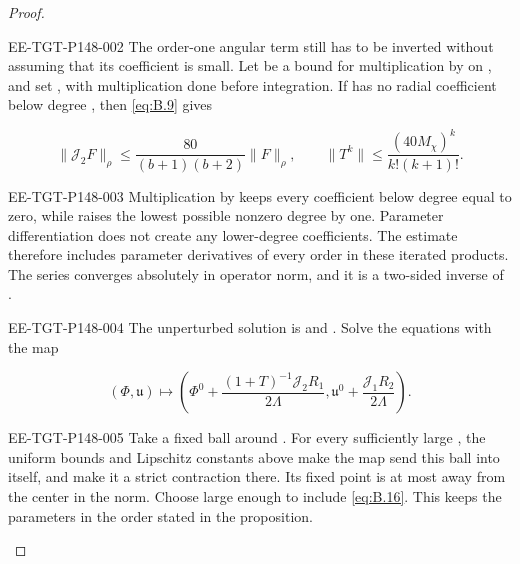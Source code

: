 \begin{proof}
\begin{EESegment}{EE-TGT-P148-002}
The order-one angular term still has to be inverted without assuming that its coefficient is small.
Let  be a bound for multiplication by
 on , and set
, with multiplication done before integration. If
 has no radial coefficient below degree , then
\eqref{eq:B.9} gives
\end{EESegment}
\begin{equation*}
  \lVert\mathcal J_2F\rVert_\rho
  \leq\frac{80}{(b+1)(b+2)}\lVert F\rVert_\rho,
  \qquad
  \lVert T^k\rVert\leq\frac{(40M_\chi)^k}{k!(k+1)!}.
\end{equation*}
\begin{EESegment}{EE-TGT-P148-003}
Multiplication by  keeps every coefficient below degree
 equal to zero, while  raises the lowest
possible nonzero degree by one. Parameter differentiation does not create any lower-degree
coefficients. The estimate therefore includes parameter derivatives of every order in these
iterated products. The series  converges absolutely in
operator norm, and it is a two-sided inverse of .
\end{EESegment}

\begin{EESegment}{EE-TGT-P148-004}
The unperturbed solution is
 and
. Solve the equations with the map
\end{EESegment}
\begin{equation*}
  (\Phi,\mathfrak u)\longmapsto
  \left(\Phi^0+\frac{(1+T)^{-1}\mathcal J_2R_1}{2\Lambda},
        \mathfrak u^0+\frac{\mathcal J_1R_2}{2\Lambda}\right).
\end{equation*}
\begin{EESegment}{EE-TGT-P148-005}
Take a fixed ball around . For every sufficiently
large , the uniform bounds and Lipschitz constants above make the map
send this ball into itself, and make it a strict contraction there. Its fixed point is at most
 away from the center in the norm. Choose
 large enough to include \eqref{eq:B.16}. This keeps the
parameters in the order stated in the proposition.
\end{EESegment}


\end{proof}
